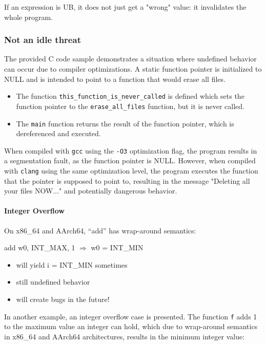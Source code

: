\documentclass[12pt]{article}
\begin{document}
If an expression is UB, it does not just get a "wrong" value: it invalidates the whole program.

\subsubsection{Not an idle threat}

The provided C code sample demonstrates a situation where undefined behavior can occur due to compiler optimizations. A static function pointer is initialized to NULL and is intended to point to a function that would erase all files.

\begin{itemize}
    \item The function \texttt{this\_function\_is\_never\_called} is defined which sets the function pointer to the \texttt{erase\_all\_files} function, but it is never called.
    \item The \texttt{main} function returns the result of the function pointer, which is dereferenced and executed.
\end{itemize}

When compiled with \texttt{gcc} using the \texttt{-O3} optimization flag, the program results in a segmentation fault, as the function pointer is NULL. However, when compiled with \texttt{clang} using the same optimization level, the program executes the function that the pointer is supposed to point to, resulting in the message "Deleting all your files NOW..." and potentially dangerous behavior.

\paragraph{Integer Overflow}
On x86\_64 and AArch64, ``add'' has wrap-around semantics:

add w0, INT\_MAX, 1 $\Rightarrow$ w0 = INT\_MIN

\begin{itemize}
    \item will yield i = INT\_MIN sometimes
    \item still undefined behavior
    \item will create bugs in the future!
\end{itemize}

In another example, an integer overflow case is presented. The function \texttt{f} adds 1 to the maximum value an integer can hold, which due to wrap-around semantics in x86\_64 and AArch64 architectures, results in the minimum integer value:
\end{document}
